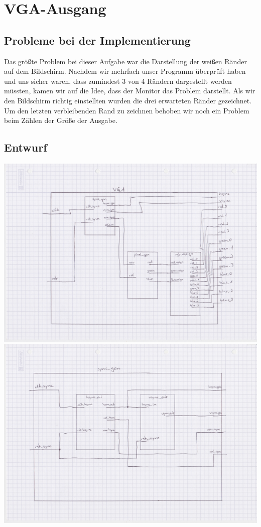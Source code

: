 \documentclass[parskip=full]{scrartcl}
\begin{document}
	\setcounter{section}{0}
	\section{VGA-Ausgang}
		\subsection{Probleme bei der Implementierung}
			Das größte Problem bei dieser Aufgabe war die Darstellung der weißen Ränder auf dem Bildschirm. Nachdem wir mehrfach unser Programm überprüft haben und uns sicher waren, dass zumindest 3 von 4 Rändern dargestellt werden müssten, kamen wir auf die Idee, dass der Monitor das Problem darstellt. Als wir den Bildschirm richtig einstellten wurden die drei erwarteten Ränder gezeichnet. Um den letzten verbleibenden Rand zu zeichnen behoben wir noch ein Problem beim Zählen der Größe der Ausgabe.
			
		\subsection{Entwurf}
			\includegraphics[scale=0.1]{Bilder/VGA.jpeg} \newline
			\includegraphics[scale=0.1]{Bilder/Sync_gen.jpeg}
			
\end{document}
